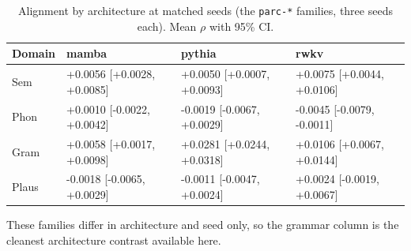 \begin{table}[t]
\centering
\small
\begin{tabular}{llll}
\toprule
Domain & mamba & pythia & rwkv \\
\midrule
Sem & +0.0056 [+0.0028, +0.0085] & +0.0050 [+0.0007, +0.0093] & +0.0075 [+0.0044, +0.0106] \\
Phon & +0.0010 [-0.0022, +0.0042] & -0.0019 [-0.0067, +0.0029] & -0.0045 [-0.0079, -0.0011] \\
Gram & +0.0058 [+0.0017, +0.0098] & +0.0281 [+0.0244, +0.0318] & +0.0106 [+0.0067, +0.0144] \\
Plaus & -0.0018 [-0.0065, +0.0029] & -0.0011 [-0.0047, +0.0024] & +0.0024 [-0.0019, +0.0067] \\
\bottomrule
\end{tabular}
\vspace{2pt}
\begin{minipage}{\linewidth}\footnotesize These families differ in architecture and seed only, so the grammar column is the cleanest architecture contrast available here.\end{minipage}
\caption{Alignment by architecture at matched seeds (the \texttt{parc-*} families, three seeds each). Mean $\rho$ with 95\% CI.}
\label{tab:t4}
\end{table}
